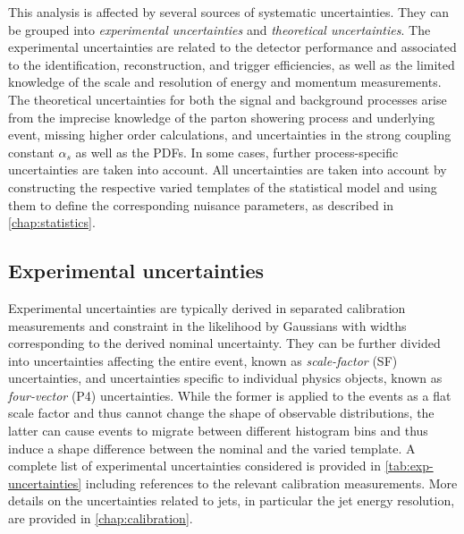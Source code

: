 This analysis is affected by several sources of systematic uncertainties.
They can be grouped into \emph{experimental uncertainties} and \emph{theoretical uncertainties}.
The experimental uncertainties are related to the detector performance and associated to the identification, reconstruction, and trigger efficiencies, as well as the limited knowledge of the scale and resolution of energy and momentum measurements.
The theoretical uncertainties for both the signal and background processes arise from the imprecise knowledge of the parton showering process and underlying event, missing higher order calculations, and uncertainties in the strong coupling constant $\alpha_s$ as well as the PDFs. In some cases, further process-specific uncertainties are taken into account.
All uncertainties are taken into account by constructing the respective varied templates of the statistical model and using them to define the corresponding nuisance parameters, as described in \cref{chap:statistics}.

\subsection{Experimental uncertainties}
Experimental uncertainties are typically derived in separated calibration measurements and constraint in the likelihood by Gaussians with widths corresponding to the derived nominal uncertainty.
They can be further divided into uncertainties affecting the entire event, known as \emph{scale-factor} (SF) uncertainties, and uncertainties specific to individual physics objects, known as \emph{four-vector} (P4) uncertainties.
While the former is applied to the events as a flat scale factor and thus cannot change the shape of observable distributions, the latter can cause events to migrate between different histogram bins and thus induce a shape difference between the nominal and the varied template.
A complete list of experimental uncertainties considered is provided in \cref{tab:exp-uncertainties} including references to the relevant calibration measurements. 
More details on the uncertainties related to jets, in particular the jet energy resolution, are provided in \cref{chap:calibration}. 


